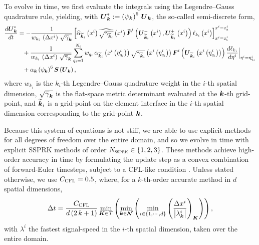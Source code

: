To evolve  in time, we first evaluate the integrals using the
Legendre--Gauss quadrature rule, yielding, with
$\boldsymbol{U}^{*}_{\boldsymbol{k}}:=\left(\psi_{\boldsymbol{k}}\right)^{6}\,\boldsymbol{U}_{\boldsymbol{k}}$,
the so-called semi-discrete form,
\begin{align}
\begin{split}
  &\frac{d\boldsymbol{U}^{*}_{\boldsymbol{k}}}{dt}
  =-\frac{1}{w_{k_{i}}\,\left(\Delta x^{i}\right)\,
  \sqrt{\overline{\gamma}_{\boldsymbol{k}}}}
  \left[\widehat{\alpha}_{\widetilde{\boldsymbol{k}}_{i}}\left(x^{i}\right)
  \widehat{\sqrt{\gamma_{\widetilde{\boldsymbol{k}}_{i}}}}\left(x^{i}\right)
  \widehat{\boldsymbol{F}}^{i}
  \left(\boldsymbol{U}_{\widetilde{\boldsymbol{k}}_{i}}^{-}\left(x^{i}\right),
  \boldsymbol{U}_{\widetilde{\boldsymbol{k}}_{i}}^{+}\left(x^{i}\right)\right)
  \ell_{k_{i}}\left(x^{i}\right)
  \right]^{x^{i}=x_{\textsc{h}}^{i}}_{x^{i}=x_{\textsc{l}}^{i}}\\
  &\hspace{3em}+\frac{1}{w_{k_{i}}\,\left(\Delta x^{i}\right)\,
  \sqrt{\overline{\gamma}_{\boldsymbol{k}}}}
  \sum\limits_{q_{i}=1}^{N_{i}}w_{q_{i}}\,
  \alpha_{\widetilde{\boldsymbol{k}}_{i}}
  \left(x^{i}\left(\eta^{i}_{q_{i}}\right)\right)
  \sqrt{\gamma_{\widetilde{\boldsymbol{k}}_{i}}}
  \left(x^{i}\left(\eta^{i}_{q_{i}}\right)\right)
  \boldsymbol{F}^{i}\left(\boldsymbol{U}_{\widetilde{\boldsymbol{k}}_{i}}
  \left(x^{i}\left(\eta^{i}_{q_{i}}\right)\right)\right)
  \frac{d\ell_{k_{i}}}{d\eta^{i}}\Big|_{\eta^{i}=\eta^{i}_{q_{i}}}\\
  &\hspace{3em}+\alpha_{\boldsymbol{k}}
  \left(\psi_{\boldsymbol{k}}\right)^{6}
  \boldsymbol{S}\left(\boldsymbol{U}_{\boldsymbol{k}}\right),
\end{split}
\label{eq.semiDis}
\end{align}
where $w_{k_{i}}$ is the $k_{i}$-th Legendre--Gauss quadrature weight
in the $i$-th spatial dimension,
$\sqrt{\overline{\gamma}_{\boldsymbol{k}}}$ is the flat-space metric determinant
evaluated at the $\boldsymbol{k}$-th grid-point,
and $\widetilde{\boldsymbol{k}}_{i}$ is a grid-point on the element interface
in the $i$-th spatial dimension corresponding to the grid-point $\boldsymbol{k}$.

Because this system of equations is not stiff, we are able to use
explicit methods for all degrees of freedom over the entire domain, and so we
evolve in time with explicit SSPRK
methods \citep[e.g., see][for a review]{gst2001} of order
$N_{\textsc{ssprk}}\in\left\{1,2,3\right\}$.
These methods achieve high-order accuracy in time by formulating the update
step as a convex combination of forward-Euler timesteps,
subject to a CFL-like condition
\citep{cs2001}.
Unless stated otherwise, we use $C_{\textsc{CFL}}=0.5$,
where, for a $k$-th-order accurate method in $d$ spatial dimensions,
\begin{equation}
  \Delta t
  =\frac{C_{\textsc{CFL}}}{d\left(2\,k+1\right)}
  \min\limits_{\boldsymbol{K}\in\mathcal{T}}\left(
  \min\limits_{\boldsymbol{k}\in\boldsymbol{\mathcal{N}}}\left(
  \min\limits_{i\in\left\{1,\cdots,d\right\}}
  \left(\frac{\Delta x^{i}}
  {\left|\lambda^{i}_{\boldsymbol{k}}\right|}\right)_{\boldsymbol{K}}\right)\right),
\end{equation}
with $\lambda^{i}$ the fastest
signal-speed in the $i$-th spatial dimension, taken over the entire domain.


